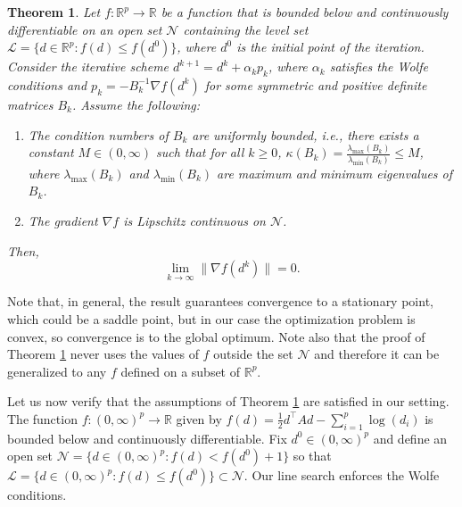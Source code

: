 \documentclass[12pt]{amsart}
\numberwithin{equation}{section}
\numberwithin{equation}{section}
\theoremstyle{plain}
\newtheorem{thm}{Theorem}
\theoremstyle{definition}
\newcommand{\R}{\mathbb{R}}
\begin{document}
\begin{thm}\label{thm:Nocedal}
Let $f\colon \mathbb{R}^p \to \mathbb{R}$ be a function that is bounded below and continuously differentiable on an open set $\mathcal{N}$ containing the level set $\mathcal{L} = \{ d \in \mathbb{R}^p \colon f(d) \leq f(d^0) \}$, where $d^0$ is the initial point of the iteration. Consider the iterative scheme $d^{k+1} = d^k + \alpha_k p_k$, where $\alpha_k$ satisfies the Wolfe conditions and $p_k = -B_k^{-1} \nabla f(d^k)$ for some symmetric and positive definite matrices $B_k$. Assume the following:
\begin{enumerate}
    \item The condition numbers of $B_k$ are uniformly bounded, i.e., there exists a constant $M \in (0,\infty)$ such that for all $k \geq 0$, $\kappa(B_k) =  \frac{\lambda_{\max}(B_k)}{\lambda_{\min}(B_k)} \leq M$, where $\lambda_{\max}(B_k)$ and $\lambda_{\min}(B_k)$ are maximum and minimum eigenvalues of $B_k$.
    \item The gradient $\nabla f$ is Lipschitz continuous on $\mathcal{N}$.
\end{enumerate}

Then,
\[\lim_{k \to \infty} \| \nabla f(d^k) \| = 0.\]
\end{thm}

Note that, in general, the result guarantees convergence to a stationary point, which could be a saddle point, but in our case the optimization problem is convex, so convergence is to the global optimum. Note also that the proof of Theorem \ref{thm:Nocedal} never uses the values of $f$ outside the set $\mathcal{N}$ and therefore it can be generalized to any $f$ defined on a subset of $\R^p$.

Let us now verify that the assumptions of Theorem \ref{thm:Nocedal} are satisfied in our setting. The function $f\colon (0,\infty)^p\to\R$ given by $f(d) = \frac12 d^\top Ad-\sum_{i=1}^p \log(d_i)$ is bounded below and continuously differentiable. Fix $d^0\in (0,\infty)^p$ and define an open set $\mathcal{N} = \{ d \in (0,\infty)^p\colon f(d) < f(d^0)+1\}$ so that $\mathcal{L} = \{ d \in (0,\infty)^p\colon f(d) \leq f(d^0) \}\subset\mathcal{N}$. Our line search enforces the Wolfe conditions.
\end{document}
